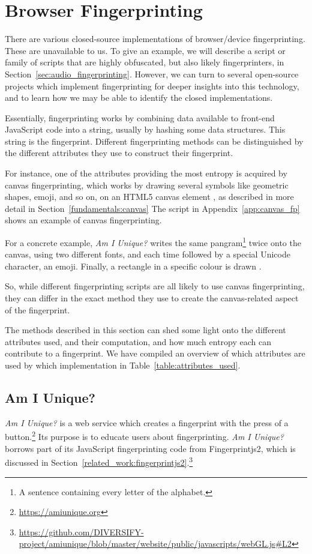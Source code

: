 \documentclass[
    fontsize=12pt,
    headings=small,
    parskip=half,
    bibliography=totoc,
    numbers=noenddot,
    open=any
    ]{scrreprt}
\begin{document}
\section{Browser Fingerprinting}
There are various closed-source implementations of browser/device fingerprinting. These are unavailable to us.
To give an example, we will describe a script or family of scripts that are highly obfuscated, but also likely
fingerprinters, in Section~\ref{sec:audio_fingerprinting}.
However, we can turn to several open-source projects which implement fingerprinting for deeper insights into this technology,
and to learn how we may be able to identify the closed implementations.

Essentially, fingerprinting works by combining data available to front-end JavaScript code into a string,
usually by hashing some data structures. This string is the fingerprint.
Different fingerprinting methods can be distinguished by the different attributes they use to construct their fingerprint.

For instance, one of the attributes providing the most entropy is acquired by canvas fingerprinting, which works by drawing
several symbols like geometric shapes, emoji, and so on, on an HTML5 canvas element \cite{laperdrix2016beauty},
as described in more detail in Section~\ref{fundamentals:canvas}
The script in Appendix~\ref{app:canvas_fp} shows an example of canvas fingerprinting.

For a concrete example, \textit{Am I Unique?} writes the same pangram\footnote{A sentence containing every letter of the alphabet.}
twice onto the canvas, using two different fonts, and each time followed by a special Unicode character, an emoji.
Finally, a rectangle in a specific colour is drawn \cite{laperdrix2016beauty}.

So, while different fingerprinting scripts are all likely to use canvas fingerprinting, they can differ in the exact
method they use to create the canvas-related aspect of the fingerprint.

The methods described in this section can shed some light onto the different attributes used, and their computation,
and how much entropy each can contribute to a fingerprint.
We have compiled an overview of which attributes are used by which implementation in Table~\ref{table:attributes_used}.


\subsection{Am I Unique?}
\label{related_work:am_i_unique}
\textit{Am I Unique?} \cite{laperdrix2016beauty} is a web service which creates
a fingerprint with the press of a button.\footnote{\url{https://amiunique.org}}
Its purpose is to educate users about fingerprinting.
\textit{Am I Unique?} borrows part of its JavaScript fingerprinting code from
Fingerprintjs2, which is discussed in Section~\ref{related_work:fingerprintjs2}.\footnote{\url{https://github.com/DIVERSIFY-project/amiunique/blob/master/website/public/javascripts/webGL.js\#L2}}
\end{document}
